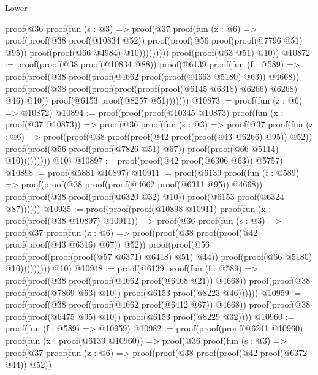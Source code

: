 \begin{lexlean}{Lower}
\begin{coremodule}
          proof(@36
              proof(fun (s : @3) =>
                proof(@37
                    proof(fun (z : @6) =>
                      proof(proof(@38 proof(@10834 @52))
                          proof(proof(@56 proof(proof(@7796 @51) @95))
                              proof(proof(@66 @4984) @10)))))))))
      proof(proof(@63 @51) @10))
@10872 := proof(proof(@38 proof(@10834 @88))
      proof(@6139
          proof(fun (f : @589) =>
            proof(proof(@38 proof(proof(@4662 proof(proof(@4663 @5180) @63)) @4668))
                proof(proof(@38 proof(proof(proof(proof(proof(@6145 @6318) @6266) @6268) @46) @10))
                    proof(@6153 proof(@8257 @51)))))))
@10873 := proof(fun (z : @6) => @10872)
@10894 := proof(proof(proof(@10345 @10873)
        proof(fun (x : proof(@37 @10873)) =>
          proof(@36
              proof(fun (s : @3) =>
                proof(@37
                    proof(fun (z : @6) =>
                      proof(proof(@38 proof(proof(@42 proof(proof(@43 @6266) @95)) @52))
                          proof(proof(@56 proof(proof(@7826 @51) @67))
                              proof(proof(@66 @5114) @10)))))))))
      @10)
@10897 := proof(proof(@42 proof(@6306 @63)) @5757)
@10898 := proof(@5881 @10897)
@10911 := proof(@6139
      proof(fun (f : @589) =>
        proof(proof(@38 proof(proof(@4662 proof(@6311 @95)) @4668))
            proof(proof(@38 proof(proof(@6320 @32) @10)) proof(@6153 proof(@6324 @87))))))
@10935 := proof(proof(proof(@10898 @10911)
        proof(fun (x : proof(proof(@38 @10897) @10911)) =>
          proof(@36
              proof(fun (s : @3) =>
                proof(@37
                    proof(fun (z : @6) =>
                      proof(proof(@38 proof(proof(@42 proof(proof(@43 @6316) @67)) @52))
                          proof(proof(@56 proof(proof(proof(proof(@57 @6371) @6418) @51) @44))
                              proof(proof(@66 @5180) @10)))))))))
      @10)
@10948 := proof(@6139
      proof(fun (f : @589) =>
        proof(proof(@38 proof(proof(@4662 proof(@6468 @21)) @4668))
            proof(proof(@38 proof(proof(@7869 @63) @10)) proof(@6153 proof(@8223 @46))))))
@10959 := proof(proof(@38 proof(proof(@4662 proof(@6412 @67)) @4668))
      proof(proof(@38 proof(proof(@6475 @95) @10)) proof(@6153 proof(@8229 @32))))
@10960 := proof(fun (f : @589) => @10959)
@10982 := proof(proof(proof(@6241 @10960)
        proof(fun (x : proof(@6139 @10960)) =>
          proof(@36
              proof(fun (s : @3) =>
                proof(@37
                    proof(fun (z : @6) =>
                      proof(proof(@38 proof(proof(@42 proof(@6372 @44)) @52))

\end{coremodule}
\end{lexlean}
